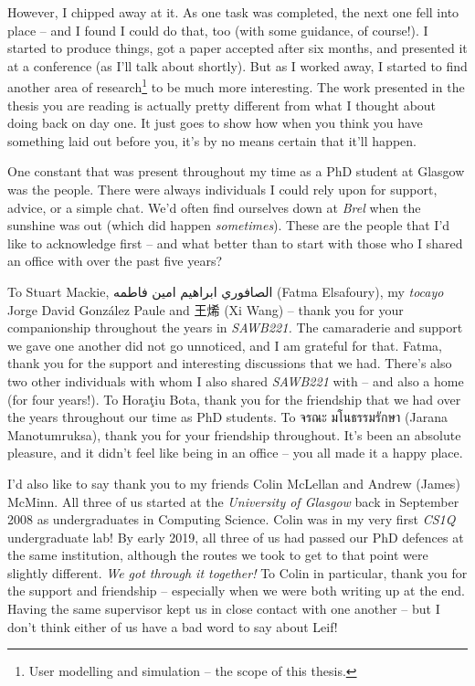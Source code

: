 \begin{preamble}
However, I chipped away at it. As one task was completed, the next one fell into place -- and I found I could do that, too (with some guidance, of course!). I started to produce things, got a paper accepted after six months, and presented it at a conference (as I'll talk about shortly). But as I worked away, I started to find another area of research\footnote{User modelling and simulation -- the scope of this thesis.} to be much more interesting. The work presented in the thesis you are reading is actually pretty different from what I thought about doing back on day one. It just goes to show how when you think you have something laid out before you, it's by no means certain that it'll happen.

One constant that was present throughout my time as a PhD student at Glasgow was the people. There were always individuals I could rely upon for support, advice, or a simple chat. We'd often find ourselves down at \emph{Brel} when the sunshine was out (which did happen \emph{sometimes}). These are the people that I'd like to acknowledge first -- and what better than to start with those who I shared an office with over the past five years?

To Stuart Mackie, {\arabicfont الصافوري ابراهيم امين فاطمه} (Fatma Elsafoury), my \emph{tocayo} Jorge David Gonz\'{a}lez Paule and {\asianfont 王烯} (Xi Wang) -- thank you for your companionship throughout the years in \emph{SAWB221.} The camaraderie and support we gave one another did not go unnoticed, and I am grateful for that. Fatma, thank you for the support and interesting discussions that we had. There's also two other individuals with whom I also shared \emph{SAWB221} with -- and also a home (for four years!). To Hora\c{t}iu Bota, thank you for the friendship that we had over the years throughout our time as PhD students. To {\thaifont \Large จรณะ มโนธรรมรักษา} (Jarana Manotumruksa), thank you for your friendship throughout. It's been an absolute pleasure, and it didn't feel like being in an office -- you all made it a happy place.

I'd also like to say thank you to my friends Colin McLellan and Andrew (James) McMinn. All three of us started at the \emph{University of Glasgow} back in September 2008 as undergraduates in Computing Science. Colin was in my very first \emph{CS1Q} undergraduate lab! By early 2019, all three of us had passed our PhD defences at the same institution, although the routes we took to get to that point were slightly different. \emph{We got through it together!} To Colin in particular, thank you for the support and friendship -- especially when we were both writing up at the end. Having the same supervisor kept us in close contact with one another -- but I don't think either of us have a bad word to say about Leif!


\end{preamble}
